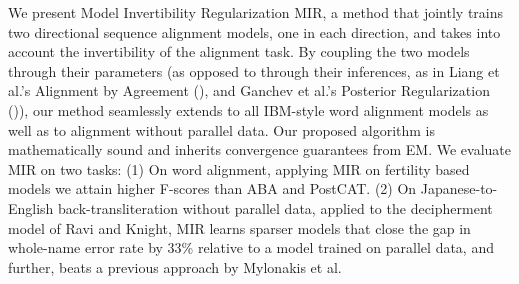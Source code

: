 We present Model Invertibility Regularization MIR, a method that jointly trains two directional sequence alignment models, one in each direction, and takes into account the invertibility of the alignment task. By coupling the two models through their parameters (as opposed to through their inferences, as in Liang et al.'s Alignment by Agreement (), and Ganchev et al.'s Posterior Regularization ()), our method seamlessly extends to all IBM-style word alignment models as well as to alignment without parallel data. Our proposed algorithm is mathematically sound and inherits convergence guarantees from EM. We evaluate MIR on two tasks: (1) On word alignment, applying MIR on fertility based models we attain higher F-scores than ABA and PostCAT. (2) On Japanese-to-English back-transliteration without parallel data, applied to the decipherment model of Ravi and Knight, MIR learns sparser models that close the gap in whole-name error rate by 33\% relative to a model trained on parallel data, and further, beats a previous approach by Mylonakis et al.
